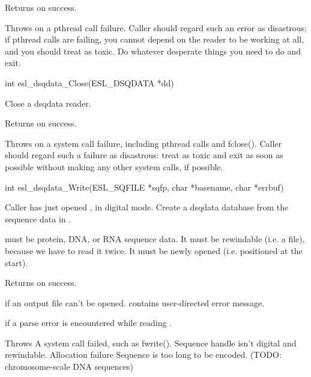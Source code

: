 \begin{sreapi}
Returns  on success. 

Throws  on a pthread call failure. Caller should regard
such an error as disastrous; if pthread calls are
failing, you cannot depend on the reader to be working
at all, and you should treat  as toxic. Do whatever
desperate things you need to do and exit.


\hypertarget{func:esl_dsqdata_Close()}
{\item[int esl\_dsqdata\_Close(ESL\_DSQDATA *dd)]}

Close a dsqdata reader.

Returns  on success.

Throws  on a system call failure, including pthread
calls and fclose(). Caller should regard such a failure
as disastrous: treat  as toxic and exit as soon as 
possible without making any other system calls, if possible.



\hypertarget{func:esl_dsqdata_Write()}
{\item[int esl\_dsqdata\_Write(ESL\_SQFILE *sqfp, char *basename, char *errbuf)]}

Caller has just opened , in digital mode.
Create a dsqdata database  from the sequence
data in .

 must be protein, DNA, or RNA sequence data.  It
must be rewindable (i.e. a file), because we have to
read it twice. It must be newly opened (i.e. positioned
at the start).

Returns  on success.

 if an output file can't be opened. 
contains user-directed error message.

 if a parse error is encountered while
reading .


Throws    A system call failed, such as fwrite().
 Sequence handle  isn't digital and rewindable.
   Allocation failure
 Sequence is too long to be encoded.
(TODO: chromosome-scale DNA sequences)


\end{sreapi}

